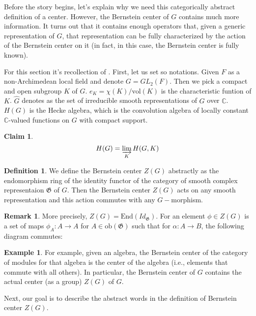 \documentclass[12pt,a4paper,english]{article}
\theoremstyle{plain}
\newtheorem{cla}[thm]{Claim}
\theoremstyle{definition}
\newtheorem{defi}{Definition}
\newtheorem*{ex}{Example}
\newtheorem*{rem}{Remark}
\begin{document}
Before the story begins, let's explain why we need this categorically abstract definition of a center. However, the Bernstein center of $G$ contains much more information. It turns out that it contains enough operators that, given a generic representation of $G$, that representation can be fully characterized by the action of the Bernstein center on it (in fact, in this case, the Bernstein center is fully known).

For this section it's recollection of \cite{zhang2019bernstein}.
 First, let us set so notations. Given $F$ as a non-Archimedean local field and denote $G=GL_{2}(F)$. Then we pick a compact and open subgroup $K$ of $G$. $e_{K}=\chi(K)/\text{vol}(K)$ is the characteristic funtion of $K$. $\hat{G}$ denotes as the set of irreducible smooth representations of $G$ over $\mathbb{C}$. $H(G)$ is the Hecke algebra, which is the convolution algebra of locally constant $\mathbb{C}$-valued functions on $G$ with compact support. 
 \begin{cla}
 \begin{equation*}
     H(G)= \varinjlim_{K} H(G, K)
 \end{equation*}
 \end{cla}
 \begin{defi}
 We define the Bernstein center $Z(G)$ abstractly as the endomorphism ring of the identity functor of the category of smooth complex representaion $\mathfrak{G}$ of $G$. Then the Bernstein center $Z(G)$ acts on any smooth representation and this action commutes with any $G-$morphism. 
 \end{defi}
 \begin{rem}
 More precisely, $Z(G)=\text{End}(Id_{\mathfrak{G}})$. For an element $\phi\in Z(G)$ is a set of maps $\phi_{A}: A\rightarrow A$ for $A\in \text{ob}(\mathfrak{G})$ such that for $\alpha: A\rightarrow B$, the following diagram commutes:
 \begin{center}
 \end{center}
 \end{rem}
\begin{ex}
 For example, given an algebra, the Bernstein center of the category of modules for that algebra is the center of the algebra (i.e., elements that commute with all others). In particular, the Bernstein center of $G$ contains the actual center (as a group) $Z(G)$ of $G$.
\end{ex}
 Next, our goal is to describe the abstract words in the definition of Bernstein center $Z(G)$.
 
\end{document}
